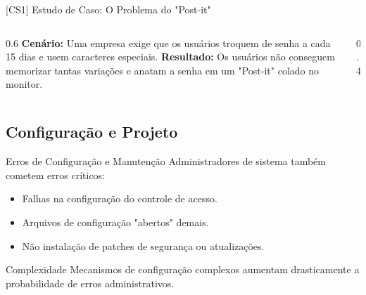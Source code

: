 \documentclass[aspectratio=169]{beamer}
\begin{document}
\begin{frame}{[CS1] Estudo de Caso: O Problema do "Post-it"}
    \begin{columns}
        \begin{column}{0.6\textwidth}
            \textbf{Cenário:} Uma empresa exige que os usuários troquem de senha a cada 15 dias e usem caracteres especiais.
            \vspace{0.3cm}
            \textbf{Resultado:} Os usuários não conseguem memorizar tantas variações e anatam a senha em um "Post-it" colado no monitor.
        \end{column}
        \begin{column}{0.4\textwidth}
            \centering
        \end{column}
    \end{columns}
\end{frame}

\subsection{Configuração e Projeto}
\begin{frame}{Erros de Configuração e Manutenção}
    Administradores de sistema também cometem erros críticos:
    \begin{itemize}
        \item Falhas na configuração do controle de acesso.
        \item Arquivos de configuração "abertos" demais.
        \item Não instalação de patches de segurança ou atualizações.
    \end{itemize}
    \begin{alertblock}{Complexidade}
        Mecanismos de configuração complexos aumentam drasticamente a probabilidade de erros administrativos.
    \end{alertblock}
\end{frame}
\end{document}
